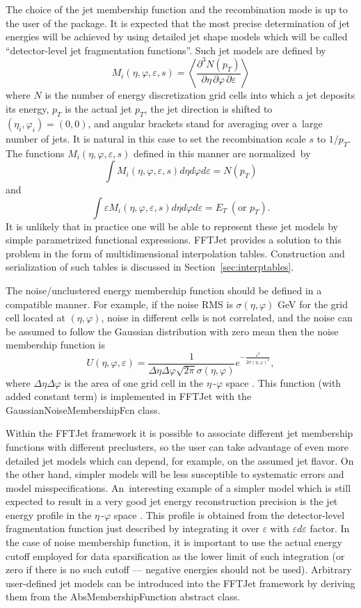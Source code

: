 \documentclass[epsf,12pt,titlepage]{article}
\def\epspace {$\eta$\,-$\varphi$ space }
\newcommand{\cname}[1]{\index{#1}\textsf{#1}}
\begin{document}
The choice of the jet membership function and the recombination mode
is up to the user of the package. It is expected that the most precise
determination of jet energies will be achieved by using detailed
jet shape models which will be called
``detector-level jet fragmentation functions''.
Such jet models are defined by
$$
M_i(\eta, \varphi, \varepsilon, s) = \left< \frac{\partial^3 N(p_T)}{\partial \eta \,\partial \varphi \,\partial \varepsilon} \right>
$$
where $N$ is the number of energy discretization grid cells
into which a jet deposits its energy, $p_T$ is the
actual jet $p_T$, the jet direction is shifted to
$(\eta_i, \varphi_i) = (0, 0)$, and angular brackets stand for averaging over
a~large number of jets. It is natural in this case to set the recombination scale $s$
to $1/p_T$. The functions $M_i(\eta, \varphi, \varepsilon, s)$
defined in this manner are normalized~by
$$
\int M_i(\eta, \varphi, \varepsilon, s) d \eta d \varphi d \varepsilon = N(p_T)
$$
and
$$
\int \varepsilon M_i(\eta, \varphi, \varepsilon, s) d \eta d \varphi d \varepsilon = E_T \ (\mbox{or } p_T).
$$
It is unlikely that in practice one will be able to represent
these jet models by simple parametrized functional expressions.
FFTJet provides a solution to this problem in the form of
multidimensional interpolation tables.
Construction and serialization of such tables is discussed in
Section~\ref{sec:interptables}.

The noise/unclustered energy membership function should be defined
in a compatible manner. For example, if the noise RMS
is $\sigma(\eta, \varphi)$ GeV for the 
grid cell located at $(\eta, \varphi)$, noise in different cells is not correlated,
and the noise can be assumed to follow
the Gaussian distribution with zero mean then the noise membership function is
$$
U(\eta, \varphi, \varepsilon) = \frac{1}{\Delta \eta \Delta \varphi \sqrt{2 \pi} \sigma(\eta, \varphi)} e^{-\frac{\varepsilon^2}{2 \sigma(\eta, \varphi)^2}},
$$
where $\Delta \eta \Delta \varphi$ is the area of one grid
cell in the \epspace\!\!. This function (with added constant term)
is implemented in FFTJet with the \cname{GaussianNoiseMembershipFcn} class.

Within the FFTJet framework it is possible to associate different jet membership
functions with different preclusters, so the user can take advantage of
even more detailed jet models which can depend, for example, on the
assumed jet flavor. On the other hand, simpler models will
be less susceptible to systematic errors and
model misspecifications. An~interesting example
of a simpler model which is still expected to result in a very good
jet energy reconstruction precision is the jet energy profile
in the \epspace\!\!. This profile is obtained from the detector-level
fragmentation function just described by integrating
it over $\varepsilon$ with $\varepsilon d\varepsilon$ factor.
In the case of noise membership function, it is important to use the actual
energy cutoff employed for data sparsification as the lower
limit of such integration (or zero if there is no such
cutoff --- negative energies should not be used). Arbitrary
user-defined jet models can be introduced into the FFTJet framework
by deriving them from the \cname{AbsMembershipFunction} abstract class.
\end{document}
